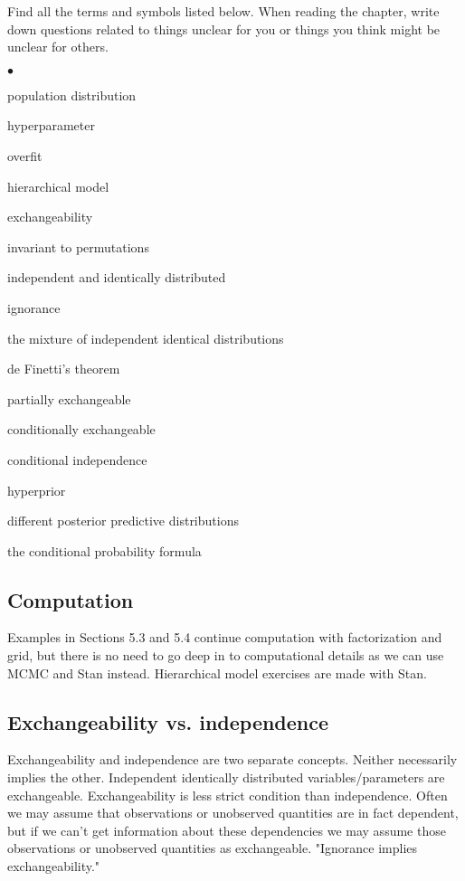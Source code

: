 \documentclass[a4paper,11pt,english]{article}
\begin{document}
Find all the terms and symbols listed below. When reading the chapter,
write down questions related to things unclear for you or things you
think might be unclear for others. 
\begin{list}{$\bullet$}{\parsep=0pt\itemsep=2pt}
\item population distribution
\item hyperparameter
\item overfit
\item hierarchical model
\item exchangeability
\item invariant to permutations
\item independent and identically distributed
\item ignorance
\item the mixture of independent identical distributions
\item de Finetti's theorem
\item partially exchangeable
\item conditionally exchangeable
\item conditional independence
\item hyperprior
\item different posterior predictive distributions
\item the conditional probability formula
\end{list}

\subsection*{Computation}

Examples in Sections 5.3 and 5.4 continue computation with
factorization and grid, but there is no need to go deep in to
computational details as we can use MCMC and Stan
instead. Hierarchical model exercises are made with Stan.

\subsection*{Exchangeability vs. independence}

Exchangeability and independence are two separate concepts.
Neither necessarily implies the other. Independent identically
distributed variables/parameters are exchangeable. Exchangeability
is less strict condition than independence. Often we may assume
that observations or unobserved quantities are in fact dependent,
but if we can't get information about these dependencies we may
assume those observations or unobserved quantities as
exchangeable. "Ignorance implies exchangeability."
\end{document}
